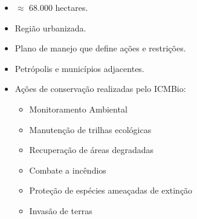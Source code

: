 \documentclass[%
  10pt,%
  aspectratio = 169,%
  compress,%
  t,%
  english,%
  brazilian,%
  tikz,
]{beamer}
\begin{document}
\begin{frame}
\begin{columns}[T]


\begin{itemize}
    \item $\approx$ 68.000 hectares.%
    \item Região urbanizada.
    \item Plano de manejo que define ações e restrições.
    \item Petrópolis e municípios adjacentes.
    \item Ações de conservação realizadas pelo ICMBio:
    \begin{itemize}
        \item Monitoramento Ambiental
        \item Manutenção de trilhas ecológicas
        \item Recuperação de áreas degradadas
        \item Combate a incêndios
        \item Proteção de espécies ameaçadas de extinção
        \item Invasão de terras
    \end{itemize}
\end{itemize}


\end{columns}
\end{frame}
\end{document}
